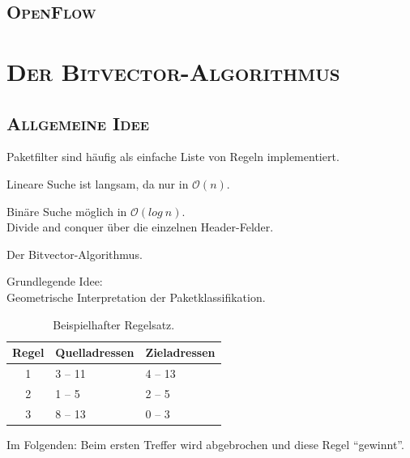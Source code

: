 \documentclass[xcolor=x11names,compress]{beamer}
\renewcommand{\(}{\begin{columns}}
\renewcommand{\)}{\end{columns}}
\newcommand{\<}[1]{\begin{column}{#1}}
\renewcommand{\>}{\end{column}}
\begin{document}
\subsection{\scshape OpenFlow}
\begin{frame}
  \frametitle{\insertsubsection}
  
\end{frame}

\section{\scshape Der Bitvector-Algorithmus}
\subsection{\scshape Allgemeine Idee}
\begin{frame}
  Paketfilter sind häufig als einfache Liste von Regeln implementiert.\\
  \begin{tcolorbox}[colback=red!5!white,colframe=red!75!black,title=Problem,drop fuzzy shadow]
  Lineare Suche ist langsam, da nur in $\mathcal O(n)$.
  \end{tcolorbox}
  \pause
  \begin{tcolorbox}[colback=yellow!5!white,colframe=yellow!75!black,title=Grundidee,drop fuzzy shadow]
  Binäre Suche möglich in $\mathcal O(log\ n)$.\\
  Divide and conquer über die einzelnen Header-Felder.
  \end{tcolorbox}
  \pause
  \begin{tcolorbox}[colback=blue!5!white,colframe=blue!75!black,title=Mögliche Lösung,drop fuzzy shadow]
  Der Bitvector-Algorithmus.
  \end{tcolorbox}
\end{frame}

\begin{frame}
  Grundlegende Idee:\\
  Geometrische Interpretation der Paketklassifikation.
  \pause
  \begin{table}
  \centering
  \begin{tabularx}{0.7\textwidth}{c|X|X}
  Regel&Quelladressen&Zieladressen\\
  \hline
  1&3 -- 11&4 -- 13\\
  2&1 -- 5&2 -- 5\\
  3&8 -- 13&0 -- 3\\
  \end{tabularx}
  \caption{Beispielhafter Regelsatz.}
  \end{table}
  Im Folgenden: Beim ersten Treffer wird abgebrochen und diese Regel \enquote{gewinnt}.
\end{frame}
\end{document}
